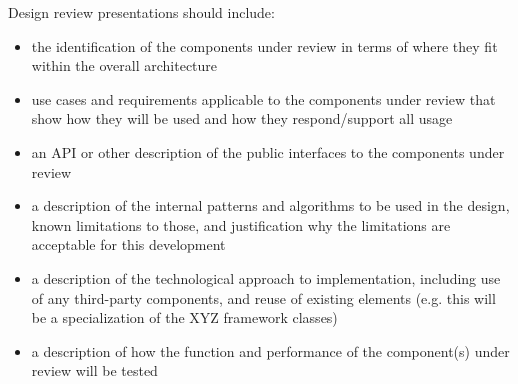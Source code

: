 Design review presentations should include:
\begin{itemize}
\item the identification of the components under review in terms of where they fit within the overall architecture
\item use cases and requirements applicable to the components under review that show how they will be used and how they respond/support all usage
\item an \gls{API} or other description of the public interfaces to the components under review
\item a description of the internal patterns and algorithms to be used in the design, known limitations to those, and justification why the limitations are acceptable for this development
\item a description of the technological approach to implementation, including use of any third-party components, and reuse of existing elements (e.g. this will be a specialization of the XYZ framework classes)
\item a description of how the function and performance of the component(s) under review will be tested
\end{itemize}
